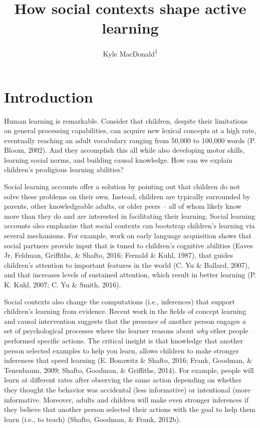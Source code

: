 \documentclass[english,floatsintext,man]{apa6}
\title{How social contexts shape active learning}
\author{Kyle MacDonald\textsuperscript{1}}
\affiliation{
    \vspace{0.5cm}
          \textsuperscript{1} Stanford University  }
\theoremstyle{definition}
\theoremstyle{definition}
\theoremstyle{definition}
\theoremstyle{remark}
\begin{document}
\maketitle

\setcounter{secnumdepth}{0}


  {
  \hypersetup{linkcolor=black}
  \setcounter{tocdepth}{2}
  \tableofcontents
  }

\newpage

\section{Introduction}\label{introduction}

Human learning is remarkable. Consider that children, despite their
limitations on general processing capabilities, can acquire new lexical
concepts at a high rate, eventually reaching an adult vocabulary ranging
from 50,000 to 100,000 words (P. Bloom, 2002). And they accomplish this
all while also developing motor skills, learning social norms, and
building causal knowledge. How can we explain children's prodigious
learning abilities?

Social learning accounts offer a solution by pointing out that children
do not solve these problems on their own. Instead, children are
typically surrounded by parents, other knowledgeable adults, or older
peers -- all of whom likely know more than they do and are interested in
facilitating their learning. Social learning accounts also emphasize
that social contexts can bootstrap children's learning via several
mechanisms. For example, work on early language acquisition shows that
social partners provide input that is tuned to children's cognitive
abilities (Eaves Jr, Feldman, Griffiths, \& Shafto, 2016; Fernald \&
Kuhl, 1987), that guides children's attention to important features in
the world (C. Yu \& Ballard, 2007), and that increases levels of
sustained attention, which result in better learning (P. K. Kuhl, 2007;
C. Yu \& Smith, 2016).

Social contexts also change the computations (i.e., inferences) that
support children's learning from evidence. Recent work in the fields of
concept learning and causal intervention suggests that the presence of
another person engages a set of psychological processes where the
learner reasons about \emph{why} other people performed specific
actions. The critical insight is that knowledge that another person
selected examples to help you learn, allows children to make stronger
inferences that speed learning (E. Bonawitz \& Shafto, 2016; Frank,
Goodman, \& Tenenbaum, 2009; Shafto, Goodman, \& Griffiths, 2014). For
example, people will learn at different rates after observing the same
action depending on whether they thought the behavior was accidental
(less informative) or intentional (more informative. Moreover, adults
and children will make even stronger inferences if they believe that
another person selected their actions with the goal to help them learn
(i.e., to teach) (Shafto, Goodman, \& Frank, 2012b).
\end{document}
